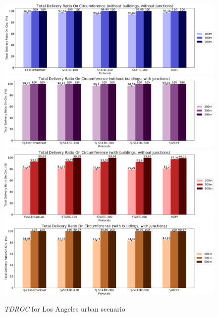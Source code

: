 		\begin{figure}[H]
			\centering
			\includegraphics[width=1.0\textwidth]{immagini/la-25/b0/j0/tdroc}
			\includegraphics[width=1.0\textwidth]{immagini/la-25/b0/j1/tdroc}
			\includegraphics[width=1.0\textwidth]{immagini/la-25/b1/j0/tdroc}
			\includegraphics[width=1.0\textwidth]{immagini/la-25/b1/j1/tdroc}
			\caption{\textit{TDROC} for Los Angeles urban scenario}
			\label{fig:la-25-tdroc}
		\end{figure}

